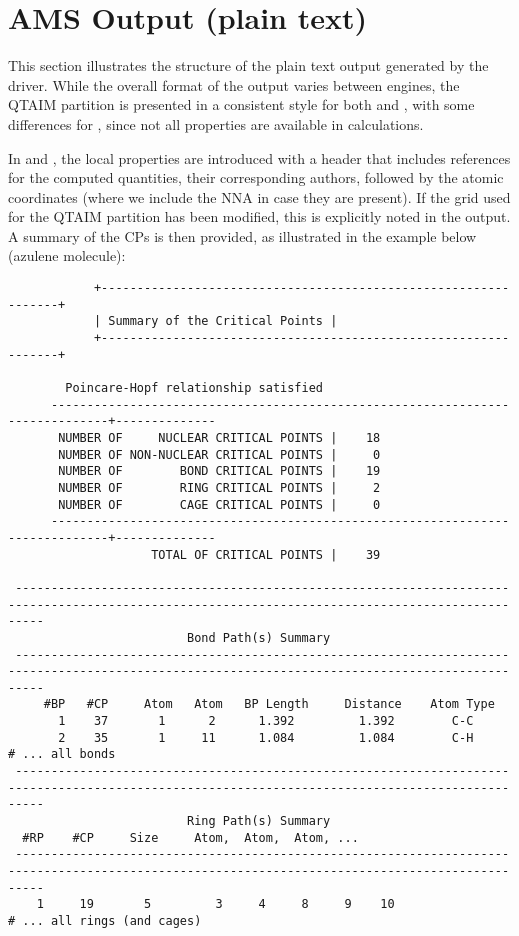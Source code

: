\newpage
\section{AMS Output (plain text)}\label{output_adf}

This section illustrates the structure of the plain text output generated by
the \ams driver. While the overall format of the output varies between
engines, the \gls{QTAIM} partition is presented in a consistent style for both
\adf and \dftb, with some differences for \band, since not all properties are
available in \band calculations.

In \adf and \dftb, the local properties are introduced with a header that
includes references for the computed quantities, their corresponding authors,
followed by the atomic coordinates (where we include the \gls{NNA} in case they
are present). If the grid used for the \gls{QTAIM} partition has been modified,
this is explicitly noted in the output. A summary of the \glspl{CP} is then
provided, as illustrated in the example below (azulene molecule):

\begin{lstlisting}
            +----------------------------------------------------------------+
            | Summary of the Critical Points |
            +----------------------------------------------------------------+

        Poincare-Hopf relationship satisfied
      ------------------------------------------------------------------------------+--------------
       NUMBER OF     NUCLEAR CRITICAL POINTS |    18
       NUMBER OF NON-NUCLEAR CRITICAL POINTS |     0
       NUMBER OF        BOND CRITICAL POINTS |    19
       NUMBER OF        RING CRITICAL POINTS |     2
       NUMBER OF        CAGE CRITICAL POINTS |     0 
      ------------------------------------------------------------------------------+--------------
                    TOTAL OF CRITICAL POINTS |    39   

 ------------------------------------------------------------------------------------------------------------------------------------------------
                         Bond Path(s) Summary
 ------------------------------------------------------------------------------------------------------------------------------------------------
     #BP   #CP     Atom   Atom   BP Length     Distance    Atom Type 
       1    37       1      2      1.392         1.392        C-C  
       2    35       1     11      1.084         1.084        C-H
# ... all bonds
 ------------------------------------------------------------------------------------------------------------------------------------------------
                         Ring Path(s) Summary
  #RP    #CP     Size     Atom,  Atom,  Atom, ...
 ------------------------------------------------------------------------------------------------------------------------------------------------
    1     19       5         3     4     8     9    10
# ... all rings (and cages)
\end{lstlisting}

